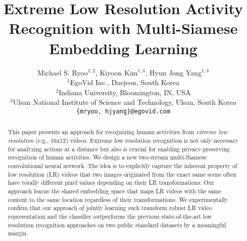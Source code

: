 \documentclass[letterpaper]{article} %
\begin{document}
%
\title{Extreme Low Resolution Activity Recognition with Multi-Siamese \\Embedding Learning}

\author{Michael S. Ryoo$^{1,2}$, Kiyoon Kim$^{1,3}$, Hyun Jong Yang$^{1,3}$\\
$^1$EgoVid Inc., Daejeon, South Korea\\
$^2$Indiana University, Bloomington, IN, USA\\
$^3$Ulsan National Institute of Science and Technology, Ulsan, South Korea\\
\texttt{\{mryoo, hjyang\}@egovid.com}\\
}

\maketitle

\begin{abstract}
This paper presents an approach for recognizing human activities from \emph{extreme low resolution} (e.g., 16x12) videos. Extreme low resolution recognition is not only necessary for analyzing actions at a distance but also is crucial for enabling privacy-preserving recognition of human activities. We design a new two-stream multi-Siamese convolutional neural network. The idea is to explicitly capture the inherent property of low resolution (LR) videos that two images originated from the exact same scene often have totally different pixel values depending on their LR transformations. Our approach learns the shared embedding space that maps LR videos with the same content to the same location regardless of their transformations. We experimentally confirm that our approach of jointly learning such transform robust LR video representation and the classifier outperforms the previous state-of-the-art low resolution recognition approaches on two public standard datasets by a meaningful margin.
\end{abstract}

\end{document}
